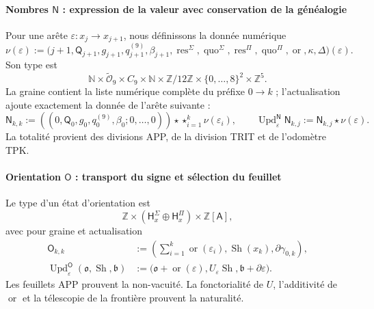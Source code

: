 \paragraph{Nombres \(\mathsf N\) : expression de la valeur avec conservation de la généalogie}
Pour une arête \(\varepsilon:x_j\to x_{j+1}\), nous définissons la donnée numérique
\begin{equation}
\label{eq:pdfv2-terminal-numero-arista}
 \nu(\varepsilon):=
 \bigl(j+1,\mathsf Q_{j+1},g_{j+1},q^{(9)}_{j+1},\beta_{j+1},
 \operatorname{res}^{\Sigma},\operatorname{quo}^{\Sigma},
 \operatorname{res}^{\Pi},\operatorname{quo}^{\Pi},
 \operatorname{or},\kappa,\Delta\bigr)(\varepsilon).
\end{equation}
Son type est
\[
 \mathbb N\times\widetilde{\mathcal O}_9\times C_9\times\mathbb N
 \times\mathbb Z/12\mathbb Z
 \times\{0,\ldots,8\}^2\times\mathbb Z^5.
\]
La graine contient la liste numérique complète du préfixe \(0\to k\) ; l'actualisation ajoute exactement la donnée de l'arête suivante :
\begin{equation}
\label{eq:pdfv2-terminal-update-n}
 \mathsf N_{k,k}:=
 ((0,\mathsf Q_0,g_0,q^{(9)}_0,\beta_0;0,\ldots,0))
 \star\mathop{\star}_{i=1}^{k}\nu(\varepsilon_i),\qquad
 \operatorname{Upd}^{\mathsf N}_{\varepsilon}\mathsf N_{k,j}
 :=\mathsf N_{k,j}\star\nu(\varepsilon).
\end{equation}
La totalité provient des divisions APP, de la division TRIT et de l'odomètre TPK.

\paragraph{Orientation \(\mathsf O\) : transport du signe et sélection du feuillet}
Le type d'un état d'orientation est
\[
 \mathbb Z\times
 (\mathsf H^\Sigma_x\oplus\mathsf H^\Pi_x)
 \times\mathbb Z[\mathsf A],
\]
avec pour graine et actualisation
\begin{align}
 \mathsf O_{k,k}&:=
 \left(\sum_{i=1}^{k}\operatorname{or}(\varepsilon_i),
       \operatorname{Sh}(x_k),\partial\gamma_{0,k}\right),
 \label{eq:pdfv2-terminal-semilla-o}\\
 \operatorname{Upd}^{\mathsf O}_{\varepsilon}
 (\mathfrak o,\operatorname{Sh},\mathfrak b)
 &:=
 \bigl(\mathfrak o+\operatorname{or}(\varepsilon),
 U_\varepsilon\operatorname{Sh},
 \mathfrak b+\partial\varepsilon\bigr).
 \label{eq:pdfv2-terminal-update-o}
\end{align}
Les feuillets APP prouvent la non-vacuité. La fonctorialité de \(U\), l'additivité de \(\operatorname{or}\) et la télescopie de la frontière prouvent la naturalité.

